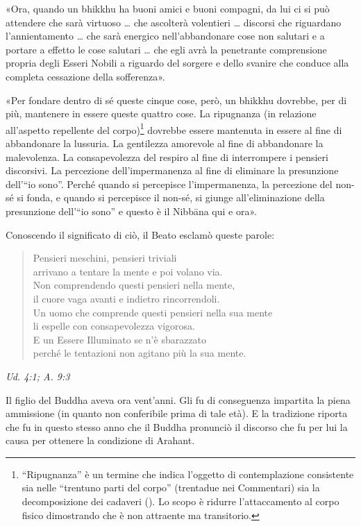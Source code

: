 «Ora, quando un bhikkhu ha buoni amici e buoni compagni, da lui ci si
può attendere che sarà virtuoso … che ascolterà volentieri … discorsi
che riguardano l’annientamento … che sarà energico nell’abbandonare cose
non salutari e a portare a effetto le cose salutari … che egli avrà la
penetrante comprensione propria degli Esseri Nobili a riguardo del
sorgere e dello svanire che conduce alla completa cessazione della
sofferenza».


«Per fondare dentro di sé queste cinque cose, però, un bhikkhu dovrebbe,
per di più, mantenere in essere queste quattro cose. La ripugnanza (in
relazione all’aspetto repellente del corpo)\footnote{“Ripugnanza” è un termine che indica l’oggetto di contemplazione consistente sia nelle “trentuno parti del corpo” (trentadue nei Commentari) sia la decomposizione dei cadaveri (\hyperlink{cap-12-La-Dottrina#pag270}{}). Lo scopo è ridurre l’attaccamento al corpo fisico dimostrando che è non attraente ma transitorio.} dovrebbe
essere mantenuta in essere al fine di abbandonare la lussuria. La
gentilezza amorevole al fine di abbandonare la malevolenza. La
consapevolezza del respiro al fine di interrompere i pensieri
discorsivi. La percezione dell’impermanenza al fine di eliminare la
presunzione dell’“io sono”. Perché quando si percepisce l’impermanenza,
la percezione del non-sé si fonda, e quando si percepisce il non-sé, si
giunge all’eliminazione della presunzione dell’“io sono” e questo è il
Nibbāna qui e ora».


Conoscendo il significato di ciò, il Beato esclamò queste parole:


\begin{quote}
Pensieri meschini, pensieri triviali \\
arrivano a tentare la mente e poi volano via. \\
Non comprendendo questi pensieri nella mente, \\
il cuore vaga avanti e indietro rincorrendoli. \\
Un uomo che comprende questi pensieri nella sua mente \\
li espelle con consapevolezza vigorosa. \\
E un Essere Illuminato se n’è sbarazzato \\
perché le tentazioni non agitano più la sua mente.
\end{quote}

\emph{Ud. 4:1; A. 9:3}


 Il figlio del Buddha aveva ora vent’anni. Gli fu di
conseguenza impartita la piena ammissione (in quanto non conferibile
prima di tale età). E la tradizione riporta che fu in questo stesso anno
che il Buddha pronunciò il discorso che fu per lui la causa per ottenere
la condizione di Arahant.


